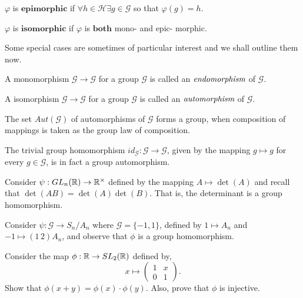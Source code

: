 \begin{defn}[Epimorphic]
	$\varphi$ is $\textbf{epimorphic}$ if $\forall h \in \mathcal{H} \exists g \in \mathcal{G}$ so that $\varphi(g) = h$.
\end{defn}

\begin{defn}[Isomorphic]
	$\varphi$ is $\textbf{isomorphic}$ if $\varphi$ is $\textbf{both}$ mono- and epic- morphic.
\end{defn}

Some special cases are sometimes of particular interest and we shall outline them now.

\begin{defn}[Endomorphic]
	A monomorphism $\mathcal{G} \to \mathcal{G}$ for a group $\mathcal{G}$
	is called an $\emph{endomorphism}$ of $\mathcal{G}$.
\end{defn}

\begin{defn}[Automorphic]
	A isomorphism $\mathcal{G} \to \mathcal{G}$ for a group $\mathcal{G}$
	is called an $\emph{automorphism}$ of $\mathcal{G}$.
\end{defn}

\begin{rem}
	The set $Aut(\mathcal{G})$ of automorphisms of $\mathcal{G}$ forms a group, when composition of
	mappings is taken as the group law of composition.
\end{rem}

\begin{exmp}
	The trivial group homomorphism $id_{\mathcal{G}} : \mathcal{G} \to \mathcal{G}$, given
	by the mapping $g \mapsto g$ for every $g \in \mathcal{G}$, is in fact a group automorphism.
\end{exmp}

\begin{exmp}
	Consider $\psi : GL_n(\mathbb{R}) \to \mathbb{R}^{\times}$ defined by the mapping
	$A \mapsto \det(A)$ and recall that $\det(AB) = \det(A) \det(B)$.
	That is, the determinant is a group homomorphism.
\end{exmp}

\begin{exmp}
	Consider $\psi : \mathcal{G} \to S_n / A_n$ where $\mathcal{G}=\{-1,1\}$, defined by
	$1 \mapsto A_n$ and $-1 \mapsto (1 \, 2) A_n$, and observe that $\phi$ is a group homomorphism.
\end{exmp}

\begin{prob}
	Consider the map $\phi : \mathbb{R} \to SL_2(\mathbb{R})$ defined by,
	\[
		x \mapsto
		\begin{pmatrix}
			1 & x \\
			0 & 1
		\end{pmatrix}.
	\]
	Show that $\phi(x + y) = \phi(x) \cdot \phi(y)$.
	Also, prove that $\phi$ is injective.
\end{prob}

